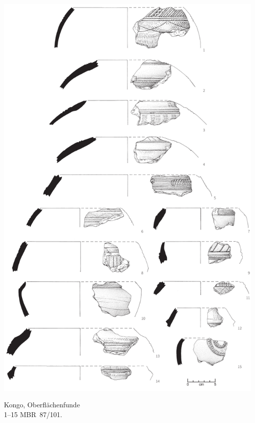 \begin{pl}[H]
	\includegraphics{plt/Taf30.pdf}
	\vspace{.75em}\caption{Kongo, Oberflächenfunde \\ 1--15 MBR~87/101.}
	\label{pl:30}
\end{pl}

